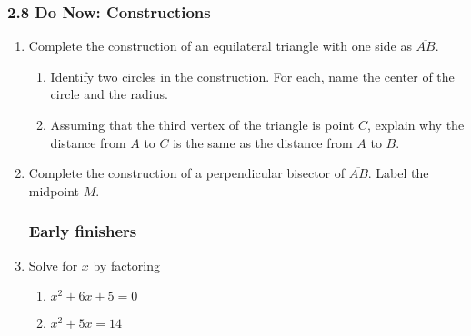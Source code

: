 \documentclass[12pt, twoside]{article}
\begin{document}
  \subsubsection*{2.8 Do Now: Constructions}

\begin{enumerate}
\item Complete the construction of an equilateral triangle with one side as $\overline{AB}$. \vspace{3cm}
  \begin{center}
  \end{center} \vspace{3cm}
  \begin{enumerate}
    \item Identify two circles in the construction. For each, name the center of the circle and the radius.  \vspace{3cm}
    \item Assuming that the third vertex of the triangle is point $C$, explain why the distance from $A$ to $C$ is the same as the distance from $A$ to $B$.
  \end{enumerate}

\newpage
\item Complete the construction of a perpendicular bisector of $\overline{AB}$. Label the midpoint $M$. \vspace{2cm}
  \begin{center}
  \end{center} \vspace{3cm}

  \subsubsection*{Early finishers}
  \item Solve for $x$ by factoring
    \begin{multicols}{2}
      \begin{enumerate}
      \item $x^2+6x+5=0$
      \item $x^2+5x=14$
      \end{enumerate}
      \end{multicols}


\end{enumerate}
\end{document}
